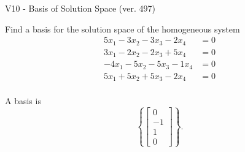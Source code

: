 \begin{exercise}
  \begin{exerciseTitle}V10 - Basis of Solution Space (ver. 497)\end{exerciseTitle}
  \begin{exerciseStatement}
    Find a basis for the solution space of the homogeneous system 
\begin{align*}
 5 x_ 1 -3 x_ 2 -3 x_ 3 -2 x_ 4 &= 0  \\ 
  3 x_ 1 -2 x_ 2 -2 x_ 3 + 5 x_ 4 &= 0  \\ 
  -4 x_ 1 -5 x_ 2 -5 x_ 3 -1 x_ 4 &= 0  \\ 
  5 x_ 1 + 5 x_ 2 + 5 x_ 3 -2 x_ 4 &= 0  \\ 
 \end{align*}


 
  \end{exerciseStatement}

  \begin{exerciseAnswer}
   A basis is   
\[\left\{\left[\begin{array}{c}
0 \\
-1 \\
1 \\
0
\end{array}\right]\right\}.\]

  


  \end{exerciseAnswer}
\end{exercise}